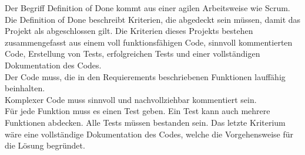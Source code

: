 Der Begriff Definition of Done kommt aus einer agilen Arbeitsweise wie Scrum.\\
Die Definition of Done beschreibt Kriterien, die abgedeckt sein müssen, damit das Projekt als abgeschlossen gilt.
Die Kriterien dieses Projekts bestehen zusammengefasst aus einem voll funktionsfähigen Code, sinnvoll kommentierten Code, Erstellung von Tests, erfolgreichen Tests und einer vollständigen Dokumentation des Codes.\\
Der Code muss, die in den Requierements beschriebenen Funktionen lauffähig beinhalten.\\
Komplexer Code muss sinnvoll und nachvollziehbar kommentiert sein.\\
Für jede Funktion muss es einen Test geben. Ein Test kann auch mehrere Funktionen abdecken. Alle Tests müssen bestanden sein.
Das letzte Kriterium wäre eine vollständige Dokumentation des Codes, welche die Vorgehensweise für die Lösung begründet.